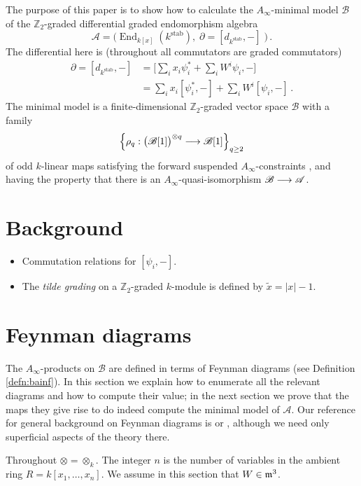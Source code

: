 \documentclass[english,letter paper,12pt,leqno]{article}
\theoremstyle{example}
\numberwithin{equation}{section}
\def\stab{\operatorname{stab}}
\def\be{\begin{equation}}
\def\ee{\end{equation}}
\def\nZ{\mathds{Z}}
\DeclareMathOperator{\End}{End}
\begin{document}
The purpose of this paper is to show how to calculate the $A_\infty$-minimal model $\mathscr{B}$ of the $\nZ_2$-graded differential graded endomorphism algebra
\be\label{eq:defnaw}
\mathscr{A} = \Big( \End_{k[x]}(k^{\operatorname{stab}}), \; \partial = [d_{k^{\stab}},-] \; \Big)\,.
\ee 
The differential here is (throughout all commutators are graded commutators)
\begin{align*}
\partial = [d_{k^{\stab}},-] &= \Big[\sum_i x_i \psi_i^* + \sum_i W^i \psi_i, -\Big]\\
&= \sum_i x_i [\psi_i^*,-] + \sum_i W^i [\psi_i,-]\,.
\end{align*}
The minimal model is a finite-dimensional $\nZ_2$-graded vector space $\mathscr{B}$ with a family 
\[
\left\{ \rho_q: \big(\mathscr{B}[1]\big)^{\otimes q} \longrightarrow \mathscr{B}[1] \right\}_{q \ge 2}
\]
of odd $k$-linear maps satisfying the forward suspended $A_\infty$-constraints \cite{lazaroiu}, and having the property that there is an $A_\infty$-quasi-isomorphism $\mathscr{B} \longrightarrow \mathscr{A}$.

\section{Background}

\begin{itemize}
\item Commutation relations for $[ \psi_i, - ]$.
\item The \emph{tilde grading} on a $\nZ_2$-graded $k$-module is defined by $\widetilde{x} = |x| - 1$. 
\end{itemize}

\section{Feynman diagrams}

The $A_\infty$-products on $\mathscr{B}$ are defined in terms of Feynman diagrams (see Definition \ref{defn:bainf}). In this section we explain how to enumerate all the relevant diagrams and how to compute their value; in the next section we prove that the maps they give rise to do indeed compute the minimal model of $\mathscr{A}$. Our reference for general background on Feynman diagrams is \cite[Ch. 6]{weinberg} or \cite[\S 4.4]{ps}, although we need only superficial aspects of the theory there.

Throughout $\otimes = \otimes_k$. The integer $n$ is the number of variables in the ambient ring $R = k[x_1,\ldots,x_n]$. We assume in this section that $W \in \mathfrak{m}^3$.
\end{document}
